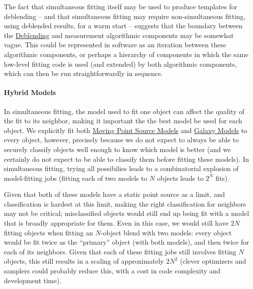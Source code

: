 The fact that simultaneous fitting itself may be used to produce templates for deblending -- and that simultaneous fitting may require non-simultaneous fitting, using deblended results, for a warm start -- suggests that the boundary between the \hyperref[sec:acDeblending]{Deblending} and measurement algorithmic components may be somewhat vague.  This could be represented in software as an iteration between these algorithmic components, or perhaps a hierarchy of components in which the same low-level fitting code is used (and extended) by both algorithmic components, which can then be run straightforwardly in sequence.

\paragraph{Hybrid Models}
\label{sec:acHybridModels}

In simultaneous fitting, the model used to fit one object can affect the quality of the fit to its neighbor, making it important the the best model be used for each object.  We explicitly fit both \hyperref[sec:acMovingPointSourceModels]{Moving Point Source Models} and \hyperref[sec:acGalaxyModels]{Galaxy Models} to every object, however, precisely because we do not expect to always be able to securely classify objects well enough to know which model is better (and we certainly do not expect to be able to classify them before fitting these models).  In simultaneous fitting, trying all possibilies leads to a combinatorial explosion of model-fitting jobs (fitting each of two models to $N$ objects leads to $2^N$ fits).

Given that both of these models have a static point source as a limit, and classification is hardest at this limit, making the right classification for neighbors may not be critical; misclassified objects would still end up being fit with a model that is broadly appropriate for them.  Even in this case, we would still have $2N$ fitting objects when fitting an $N$-object blend with two models: every object would be fit twice as the ``primary'' object (with both models), and then twice for each of its neighbors.  Given that each of these fitting jobs still involves fitting $N$ objects, this still results in a scaling of approximately $2N^2$ (clever optimizers and samplers could probably reduce this, with a cost in code complexity and development time).

